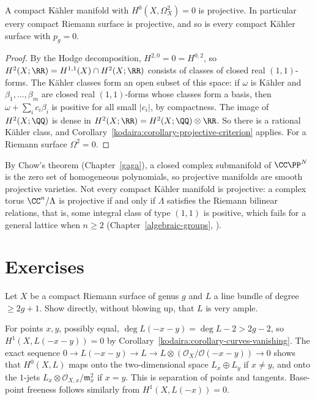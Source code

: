 \begin{corollary}\label{kodaira:corollary-h20-zero}
A compact K\"ahler manifold with $H^0(X, \Omega^2_X) = 0$ is projective. In particular every compact Riemann surface is projective, and so is
every compact K\"ahler surface with $p_g = 0$.
\end{corollary}

\begin{proof}
By the Hodge decomposition, $H^{2,0} = 0 = H^{0,2}$, so $H^2(X; \RR) = H^{1,1}(X) \cap H^2(X; \RR)$ consists of classes of closed real $(1,1)$-forms.
The K\"ahler classes form an open subset of this space: if $\omega$ is K\"ahler and $\beta_1, \ldots, \beta_m$ are closed real $(1,1)$-forms whose
classes form a basis, then $\omega + \sum_ic_i\beta_i$ is positive for all small $|c_i|$, by compactness. The image of $H^2(X; \QQ)$ is dense in
$H^2(X; \RR) = H^2(X; \QQ) \otimes \RR$. So there is a rational K\"ahler class, and Corollary~\ref{kodaira:corollary-projective-criterion} applies.
For a Riemann surface $\Omega^2 = 0$.
\end{proof}

\begin{remark}\label{kodaira:remark-chow-tori}
By Chow's theorem (Chapter~\ref{gaga}), a closed complex submanifold of $\CC\PP^N$ is the zero set of homogeneous polynomials, so projective
manifolds are smooth projective varieties. Not every compact K\"ahler manifold is projective: a complex torus $\CC^n/\Lambda$ is projective if
and only if $\Lambda$ satisfies the Riemann bilinear relations, that is, some integral class of type $(1,1)$ is positive, which fails for a
general lattice when $n \geq 2$ (Chapter~\ref{algebraic-groups}, \cite{birkenhake-lange}).
\end{remark}

\section{Exercises}\label{kodaira:section-exercises}

\begin{exercise}\label{kodaira:exercise-curves-very-ample}
Let $X$ be a compact Riemann surface of genus $g$ and $L$ a line bundle of degree $\geq 2g + 1$. Show directly, without blowing up, that $L$ is very
ample.
\end{exercise}

\begin{solution}
For points $x, y$, possibly equal, $\deg L(-x-y) = \deg L - 2 > 2g - 2$, so $H^1(X, L(-x-y)) = 0$ by Corollary~\ref{kodaira:corollary-curves-vanishing}.
The exact sequence $0 \to L(-x-y) \to L \to L \otimes (\mathcal{O}_X/\mathcal{O}(-x-y)) \to 0$ shows that $H^0(X, L)$ maps onto the two-dimensional
space $L_x \oplus L_y$ if $x \neq y$, and onto the $1$-jets $L_x \otimes \mathcal{O}_{X,x}/\mathfrak{m}_x^2$ if $x = y$. This is separation of points and tangents.
Base-point freeness follows similarly from $H^1(X, L(-x)) = 0$.
\end{solution}

